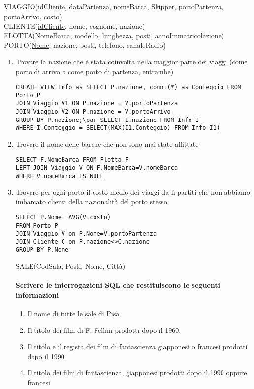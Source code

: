 \documentclass[a4paper]{article}
\begin{document}
VIAGGIO(\underline{idCliente}, \underline{dataPartenza}, \underline{nomeBarca}, Skipper, portoPartenza, portoArrivo, costo)\\
CLIENTE(\underline{idCliente}, nome, cognome, nazione)\\
FLOTTA(\underline{NomeBarca}, modello, lunghezza, posti, annoImmatricolazione)\\
PORTO(\underline{Nome}, nazione, posti, telefono, canaleRadio)
\begin{enumerate}
\item Trovare la nazione che è stata coinvolta nella maggior parte dei viaggi (come porto di arrivo o come porto di partenza, entrambe)
\begin{verbatim}
CREATE VIEW Info as SELECT P.nazione, count(*) as Conteggio FROM Porto P
JOIN Viaggio V1 ON P.nazione = V.portoPartenza
JOIN Viaggio V2 ON P.nazione = V.portoArrivo
GROUP BY P.nazione;\par SELECT I.nazione FROM Info I
WHERE I.Conteggio = SELECT(MAX(I1.Conteggio) FROM Info I1)
\end{verbatim}
\item Trovare il nome delle barche che non sono mai state affittate
\begin{verbatim}
SELECT F.NomeBarca FROM Flotta F
LEFT JOIN Viaggio V ON F.NomeBarca=V.nomeBarca
WHERE V.nomeBarca IS NULL
\end{verbatim}
\item Trovare per ogni porto il costo medio dei viaggi da lì partiti che non abbiamo imbarcato clienti della nazionalità del porto stesso.
\begin{verbatim}
SELECT P.Nome, AVG(V.costo)
FROM Porto P
JOIN Viaggio V on P.Nome=V.portoPartenza
JOIN Cliente C on P.nazione<>C.nazione
GROUP BY P.Nome
\end{verbatim}
SALE(\underline{CodSala}, Posti, Nome, Città)\par \paragraph{Scrivere le interrogazioni SQL che restituiscono le seguenti informazioni}
\begin{enumerate}
\item Il nome di tutte le sale di Pisa
\item Il titolo dei film di F. Fellini prodotti dopo il 1960.
\item Il titolo e il regista dei film di fantascienza giapponesi o francesi prodotti dopo il 1990
\item Il titolo dei film di fantascienza, giapponesi prodotti dopo il 1990 oppure francesi

\end{enumerate}
\end{enumerate}
\end{document}
